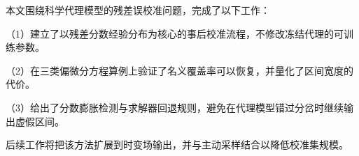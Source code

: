 \begin{conclusions}
本文围绕科学代理模型的残差误校准问题，完成了以下工作：

（1）建立了以残差分数经验分布为核心的事后校准流程，不修改冻结代理的可训练参数。

（2）在三类偏微分方程算例上验证了名义覆盖率可以恢复，并量化了区间宽度的代价。

（3）给出了分数膨胀检测与求解器回退规则，避免在代理模型错过分岔时继续输出虚假区间。

后续工作将把该方法扩展到时变场输出，并与主动采样结合以降低校准集规模。
\end{conclusions}

